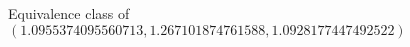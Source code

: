 \documentclass[preview]{standalone}
\begin{document}
\begin{center}
Equivalence class of $(1.0955374095560713, 1.267101874761588, 1.0928177447492522)$
\end{center}
\end{document}
